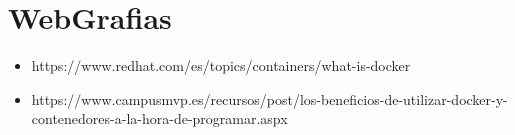 \section{WebGrafias} 

\begin{itemize}
	\item https://www.redhat.com/es/topics/containers/what-is-docker
	\item https://www.campusmvp.es/recursos/post/los-beneficios-de-utilizar-docker-y-contenedores-a-la-hora-de-programar.aspx
\end{itemize}


